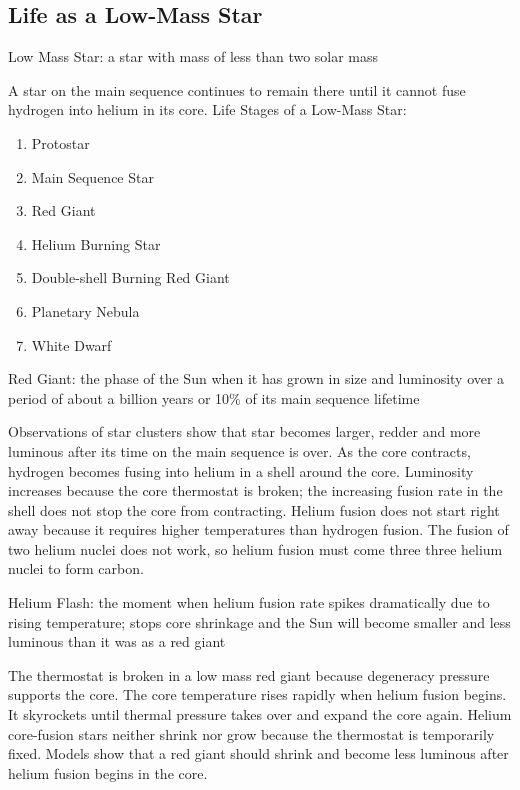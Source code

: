 \documentclass[12pt]{article}
\begin{document}
\subsection{Life as a Low-Mass Star}
\begin{definition} Low Mass Star: a star with mass of less than two solar mass \end{definition}
A star on the main sequence continues to remain there until it cannot fuse hydrogen into helium in its core. \newpage
Life Stages of a Low-Mass Star: \begin{enumerate} 
\item Protostar 
\item Main Sequence Star 
\item Red Giant 
\item Helium Burning Star 
\item Double-shell Burning Red Giant 
\item Planetary Nebula 
\item White Dwarf \end{enumerate} 
\begin{definition} Red Giant: the phase of the Sun when it has grown in size and luminosity over a period of about a billion years or 10\% of its main sequence lifetime \end{definition}
Observations of star clusters show that star becomes larger, redder and more luminous after its time on the main sequence is over. As the core contracts, hydrogen becomes fusing into helium in a shell around the core. Luminosity increases because the core thermostat is broken; the increasing fusion rate in the shell does not stop the core from contracting. Helium fusion does not start right away because it requires higher temperatures than hydrogen fusion. The fusion of two helium nuclei does not work, so helium fusion must come three three helium nuclei to form carbon. 
\begin{definition} Helium Flash: the moment when helium fusion rate spikes dramatically due to rising temperature; stops core shrinkage and the Sun will become smaller and less luminous than it was as a red giant \end{definition}
The thermostat is broken in a low mass red giant because degeneracy pressure supports the core. The core temperature rises rapidly when helium fusion begins. It skyrockets until thermal pressure takes over and expand the core again. Helium core-fusion stars neither shrink nor grow because the thermostat is temporarily fixed. Models show that a red giant should shrink and become less luminous after helium fusion begins in the core. \\~\\
\end{document}
